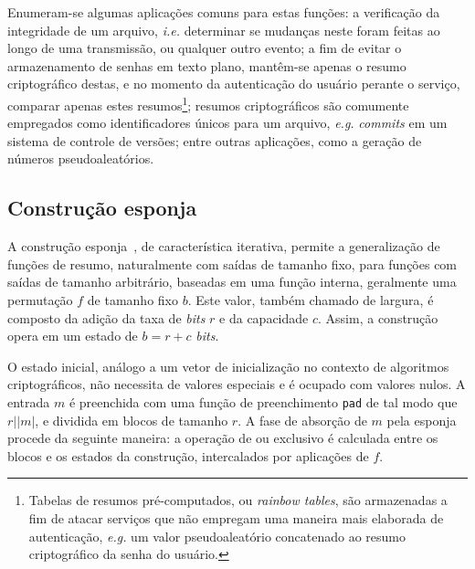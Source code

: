 \documentclass{ufsctex/ufsctex}
\newcommand{\length}[1]{\vert{} #1 \vert{}}
\begin{document}
Enumeram-se algumas aplicações comuns para estas funções: a verificação da
integridade de um arquivo, \emph{i.e.} determinar se mudanças neste foram
feitas ao longo de uma transmissão, ou qualquer outro evento; a fim de evitar o
armazenamento de senhas em texto plano, mantêm-se apenas o resumo criptográfico
destas, e no momento da autenticação do usuário perante o serviço, comparar
apenas estes resumos\footnote{Tabelas de resumos pré-computados, ou
\emph{rainbow tables}, são armazenadas a fim de atacar serviços que não
empregam uma maneira mais elaborada de autenticação, \emph{e.g.} um valor
pseudoaleatório concatenado ao resumo criptográfico da senha do usuário.};
resumos criptográficos são comumente empregados como identificadores únicos
para um arquivo, \emph{e.g.} \emph{commits} em um sistema de controle de
versões; entre outras aplicações, como a geração de números pseudoaleatórios.

\subsection{Construção esponja}\label{subsection:sponge}

A construção esponja~\cite{Bertoni:misc:2011a:jan}, de característica
iterativa, permite a generalização de funções de resumo, naturalmente com
saídas de tamanho fixo, para funções com saídas de tamanho arbitrário, baseadas
em uma função interna, geralmente uma permutação $f$ de tamanho fixo $b$. Este
valor, também chamado de largura, é composto da adição da taxa de \emph{bits}
$r$ e da capacidade $c$. Assim, a construção opera em um estado de $b = r + c$
\emph{bits}.

O estado inicial, análogo a um vetor de inicialização no contexto de algoritmos
criptográficos, não necessita de valores especiais e é ocupado com valores
nulos. A entrada $m$ é preenchida com uma função de preenchimento \texttt{pad}
de tal modo que $r \mid \length{m}$, e dividida em blocos de tamanho $r$. A
fase de absorção de $m$ pela esponja procede da seguinte maneira: a operação de
ou exclusivo é calculada entre os blocos e os estados da construção,
intercalados por aplicações de $f$.
\end{document}
